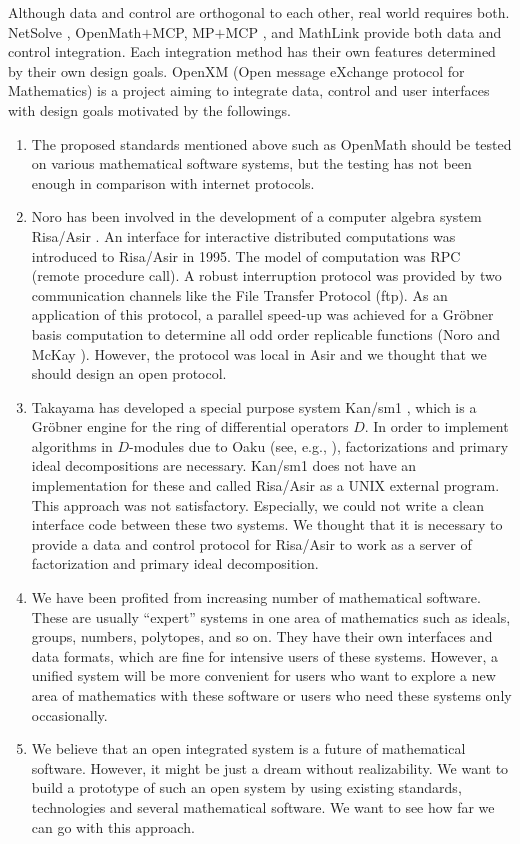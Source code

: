 Although data and control are orthogonal to each other,
real world requires both.
NetSolve \cite{netsolve}, OpenMath$+$MCP, MP$+$MCP \cite{iamc},
and MathLink \cite{mathlink} provide both data and control integration.
Each integration method has their own features determined by their
own design goals.
OpenXM (Open message eXchange protocol for Mathematics)
is a project aiming to integrate data, control and user interfaces
with design goals motivated by the followings.
\begin{enumerate}
\item The proposed standards mentioned above such as OpenMath 
should be tested on various mathematical software systems, 
but the testing has not been enough in comparison with
internet protocols.
\item Noro has been involved in the development of 
a computer algebra system Risa/Asir \cite{asir}.
An interface for interactive distributed computations was introduced
to Risa/Asir 
in 1995.
The model of computation was RPC (remote procedure call).
A robust interruption protocol was provided 
by  two communication channels
like the File Transfer Protocol (ftp).
As an application of this protocol,
a parallel speed-up was achieved for a Gr\"obner basis computation
to determine all odd order replicable functions 
(Noro and McKay \cite{noro-mckay}).
However, the protocol was local in Asir and we thought that we should
design an open protocol.
\item Takayama has developed
a special purpose system Kan/sm1 \cite{kan},
which is a Gr\"obner engine for the ring of differential operators $D$. 
In order to implement algorithms in $D$-modules due to Oaku 
(see, e.g., \cite{sst-book}),
factorizations and primary ideal decompositions are necessary.
Kan/sm1 does not have an implementation for these and called
Risa/Asir as a UNIX external program.
This approach was not satisfactory.
Especially, we could not write a clean interface code between these
two systems.
We thought that it is necessary to provide a data and control protocol
for Risa/Asir to work as a server of factorization and primary ideal
decomposition.
\item We have been profited from increasing number 
of mathematical software.
These are usually ``expert'' systems in one area of mathematics
such as ideals, groups, numbers, polytopes, and so on.
They have their own interfaces and data formats,
which are fine for intensive users of these systems.
However, a unified system will be more convenient
for users who want to explore a new area of mathematics with these
software or users who need these systems only occasionally.

\item  We believe that an open integrated system is a future of mathematical
software.
However, it might be just a dream without realizability.
We want to build a prototype of such an open system by using
existing standards, technologies and several mathematical software.
We want to see how far we can go with this approach.
\end{enumerate}

